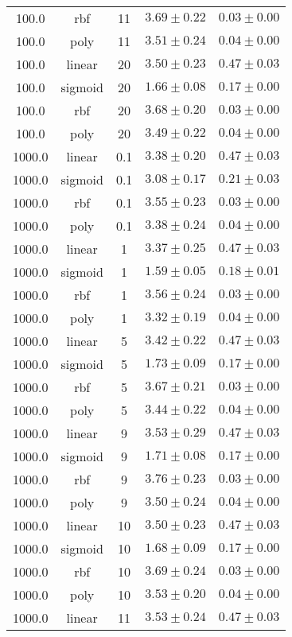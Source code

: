 \begin{tabular}{cccrr}
100.0 & rbf & 11 & $3.69 \pm 0.22$ & $0.03 \pm 0.00$\\
100.0 & poly & 11 & $3.51 \pm 0.24$ & $0.04 \pm 0.00$\\
100.0 & linear & 20 & $3.50 \pm 0.23$ & $0.47 \pm 0.03$\\
100.0 & sigmoid & 20 & $1.66 \pm 0.08$ & $0.17 \pm 0.00$\\
100.0 & rbf & 20 & $3.68 \pm 0.20$ & $0.03 \pm 0.00$\\
100.0 & poly & 20 & $3.49 \pm 0.22$ & $0.04 \pm 0.00$\\
1000.0 & linear & 0.1 & $3.38 \pm 0.20$ & $0.47 \pm 0.03$\\
1000.0 & sigmoid & 0.1 & $3.08 \pm 0.17$ & $0.21 \pm 0.03$\\
1000.0 & rbf & 0.1 & $3.55 \pm 0.23$ & $0.03 \pm 0.00$\\
1000.0 & poly & 0.1 & $3.38 \pm 0.24$ & $0.04 \pm 0.00$\\
1000.0 & linear & 1 & $3.37 \pm 0.25$ & $0.47 \pm 0.03$\\
1000.0 & sigmoid & 1 & $1.59 \pm 0.05$ & $0.18 \pm 0.01$\\
1000.0 & rbf & 1 & $3.56 \pm 0.24$ & $0.03 \pm 0.00$\\
1000.0 & poly & 1 & $3.32 \pm 0.19$ & $0.04 \pm 0.00$\\
1000.0 & linear & 5 & $3.42 \pm 0.22$ & $0.47 \pm 0.03$\\
1000.0 & sigmoid & 5 & $1.73 \pm 0.09$ & $0.17 \pm 0.00$\\
1000.0 & rbf & 5 & $3.67 \pm 0.21$ & $0.03 \pm 0.00$\\
1000.0 & poly & 5 & $3.44 \pm 0.22$ & $0.04 \pm 0.00$\\
1000.0 & linear & 9 & $3.53 \pm 0.29$ & $0.47 \pm 0.03$\\
1000.0 & sigmoid & 9 & $1.71 \pm 0.08$ & $0.17 \pm 0.00$\\
1000.0 & rbf & 9 & $3.76 \pm 0.23$ & $0.03 \pm 0.00$\\
1000.0 & poly & 9 & $3.50 \pm 0.24$ & $0.04 \pm 0.00$\\
1000.0 & linear & 10 & $3.50 \pm 0.23$ & $0.47 \pm 0.03$\\
1000.0 & sigmoid & 10 & $1.68 \pm 0.09$ & $0.17 \pm 0.00$\\
1000.0 & rbf & 10 & $3.69 \pm 0.24$ & $0.03 \pm 0.00$\\
1000.0 & poly & 10 & $3.53 \pm 0.20$ & $0.04 \pm 0.00$\\
1000.0 & linear & 11 & $3.53 \pm 0.24$ & $0.47 \pm 0.03$\\

\end{tabular}
